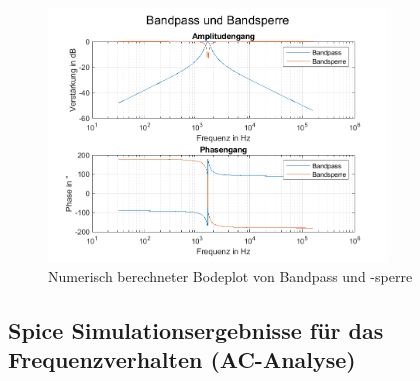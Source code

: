 \begin{figure}[H]
    \begin{center}
        \includegraphics[width=0.8\textwidth]{img/Aufgabe2_5_Band.png}
        \caption{Numerisch berechneter Bodeplot von Bandpass und -sperre}
        \label{fig:A2_band}
    \end{center}
\end{figure}

\subsection{Spice Simulationsergebnisse für das Frequenzverhalten (AC-Analyse)}


